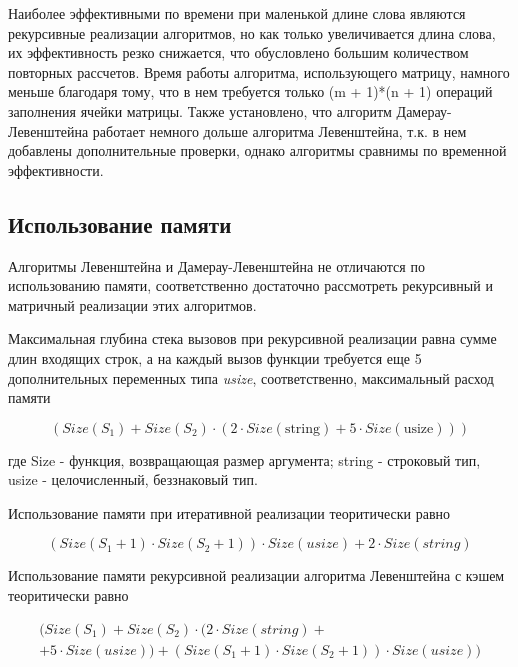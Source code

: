 \documentclass[14pt,russian]{scrartcl}
\begin{document}
	Наиболее эффективными по времени при маленькой длине слова являются рекурсивные реализации алгоритмов, но как только увеличивается длина слова, их эффективность резко снижается, что обусловлено большим количеством повторных рассчетов. Время работы алгоритма, использующего матрицу, намного меньше благодаря тому, что в нем требуется только (m + 1)*(n + 1) операций заполнения ячейки матрицы. Также установлено, что алгоритм Дамерау-Левенштейна работает немного дольше алгоритма Левенштейна, т.к. в нем добавлены дополнительные проверки, однако алгоритмы сравнимы по временной эффективности.

	\subsection{Использование памяти}

	\par
	Алгоритмы Левенштейна и Дамерау-Левенштейна не отличаются по использованию памяти, соответственно достаточно рассмотреть рекурсивный и матричный реализации этих алгоритмов.

	\par
	Максимальная глубина стека вызовов при рекурсивной реализации равна сумме длин входящих строк, а на каждый вызов функции требуется еще 5 дополнительных переменных типа \textit{usize}, соответственно, максимальный расход памяти

	\begin{equation}
		(Size(S_{1}) + Size(S_{2}) \cdot (2 \cdot Size(\text{string}) + 5 \cdot Size(\text{usize})))
	\end{equation}
	
	\noindent
	где Size - функция, возвращающая размер аргумента; string - строковый тип, usize - целочисленный, беззнаковый тип.

	\par
	Использование памяти при итеративной реализации теоритически равно

	\begin{equation}
		\label{eq:mem_req}
		(Size(S_{1} + 1) \cdot Size(S_{2} + 1)) \cdot Size(usize) + 2 \cdot Size(string)
	\end{equation}

	\par
	Использование памяти рекурсивной реализации алгоритма Левенштейна с кэшем теоритически равно

	\begin{multline}
		\label{eq:mem_iter}
		(Size(S_{1}) + Size(S_{2}) \cdot (2 \cdot Size(string) +\\+ 5 \cdot Size(usize)) + (Size(S_{1} + 1) \cdot Size(S_{2} + 1)) \cdot Size(usize))
	\end{multline}
\end{document}

